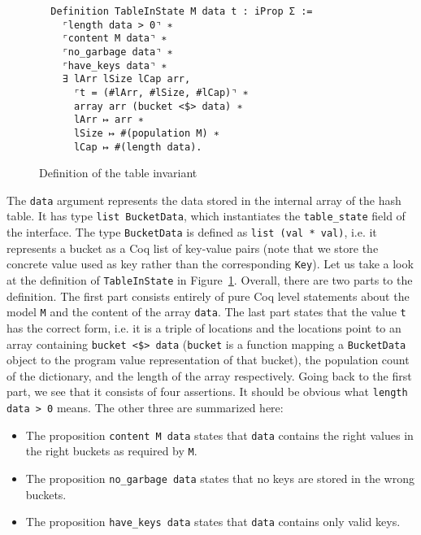 \documentclass[10pt,a4paper]{article}
\begin{document}
\begin{figure}
\begin{verbatim}
  Definition TableInState M data t : iProp Σ :=
    ⌜length data > 0⌝ ∗
    ⌜content M data⌝ ∗
    ⌜no_garbage data⌝ ∗
    ⌜have_keys data⌝ ∗
    ∃ lArr lSize lCap arr,
      ⌜t = (#lArr, #lSize, #lCap)⌝ ∗
      array arr (bucket <$> data) ∗
      lArr ↦ arr ∗
      lSize ↦ #(population M) ∗
      lCap ↦ #(length data).
\end{verbatim}
\caption{Definition of the table invariant}
\label{fig:table_in_state}
\end{figure}

The \texttt{data} argument represents the data stored in the internal array of the hash table. It has type \texttt{list BucketData}, which instantiates the \texttt{table\_state} field of the interface. The type \texttt{BucketData} is defined as \texttt{list (val * val)}, i.e. it represents a bucket as a Coq list of key-value pairs (note that we store the concrete value used as key rather than the corresponding \texttt{Key}). Let us take a look at the definition of \texttt{TableInState} in Figure~\ref{fig:table_in_state}. Overall, there are two parts to the definition. The first part consists entirely of pure Coq level statements about the model \texttt{M} and the content of the array \texttt{data}. The last part states that the value \texttt{t} has the correct form, i.e. it is a triple of locations and the locations point to an array containing \texttt{bucket <\$> data} (\texttt{bucket} is a function mapping a \texttt{BucketData} object to the program value representation of that bucket), the population count of the dictionary, and the length of the array respectively. Going back to the first part, we see that it consists of four assertions. It should be obvious what \texttt{length data > 0} means. The other three are summarized here:
\begin{itemize}
\item The proposition \texttt{content M data} states that \texttt{data} contains the right values in the right buckets as required by \texttt{M}.
\item The proposition \texttt{no\_garbage data} states that no keys are stored in the wrong buckets.
\item The proposition \texttt{have\_keys data} states that \texttt{data} contains only valid keys.
\end{itemize}
\end{document}
